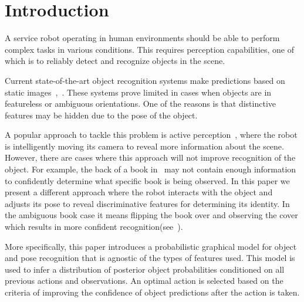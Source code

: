 \section{Introduction}


	A service robot operating in human environments should be able to perform complex tasks in various conditions. This requires perception capabilities, one of which is to reliably detect and recognize objects in the scene.

	Current state-of-the-art object recognition systems make predictions based on static images~\cite{tang2012textured},~\cite{van2013fusing}. These systems prove limited in cases when objects are in featureless or ambiguous orientations. One of the reasons is that distinctive features may be hidden due to the pose of the object. 
	
    
A popular approach to tackle this problem is active perception~\cite{atanasov2013hypothesis}, where the robot is intelligently moving its camera to reveal more information about the scene. However, there are cases where this approach will not improve recognition of the object. For example, the back of a book in~ may not contain enough information to confidently determine what specific book is being observed.  In this paper we present a different approach where the robot interacts with the object and adjusts its pose to reveal discriminative features for determining its identity. In the ambiguous book case it means flipping the book over and observing the cover which results in more confident recognition(see~).

More specifically, this paper introduces a probabilistic graphical model for object and pose recognition that is agnostic of the types of  features used. This model is used to infer a distribution of posterior object probabilities conditioned on all previous actions and observations. An optimal action is selected based on the criteria of improving the confidence of object predictions after the action is taken. 

